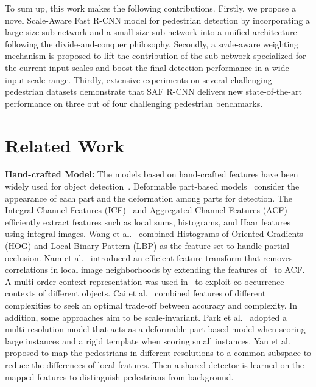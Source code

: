 \documentclass[journal]{IEEEtran}
\begin{document}
To sum up, this work makes the following contributions. Firstly, we propose a novel Scale-Aware Fast R-CNN model for pedestrian detection by incorporating a large-size sub-network and a small-size sub-network into a unified architecture following the divide-and-conquer philosophy. Secondly, a scale-aware weighting mechanism is proposed to lift the contribution of the sub-network specialized for the current input scales and boost the final detection performance in a wide input scale range. Thirdly, extensive experiments on several challenging pedestrian datasets demonstrate that SAF R-CNN delivers new state-of-the-art performance on three out of four challenging pedestrian benchmarks.


\section{Related Work}
\textbf{Hand-crafted Model:} The models based on hand-crafted features have been widely used for object detection~\cite{dalal2005histograms,viola2003detecting,wang2009hog,dollar2009integral,compact,dollar2014fast,zhang2014informed,felzenszwalb2010object,zheng2013strip,pang2014distributed,pang2016learning}. Deformable part-based models~\cite{felzenszwalb2010object} consider the appearance of each part and the deformation among parts for detection. The Integral Channel Features (ICF)~\cite{dollar2009integral} and Aggregated Channel Features (ACF)~\cite{dollar2014fast} efficiently extract features such as local sums, histograms, and Haar features using integral images. Wang et al.~\cite{wang2009hog} combined Histograms of Oriented Gradients (HOG) and Local Binary Pattern (LBP) as the feature set to handle partial occlusion. Nam et al.~\cite{nam2014local} introduced an efficient feature transform that removes correlations in local image neighborhoods by extending the features of~\cite{hariharan2012discriminative} to ACF. A multi-order context representation was used in~\cite{chen2013detection} to exploit co-occurrence contexts of different objects. Cai et al.~\cite{compact} combined features of different complexities to seek an optimal trade-off between accuracy and complexity. In addition, some approaches aim to be scale-invariant. Park et al.~\cite{park2010multiresolution} adopted a multi-resolution model that acts as a deformable part-based model when scoring large instances and a rigid template when scoring small instances. Yan et al.~\cite{yan2013robust} proposed to map the pedestrians in different resolutions to a common subspace to reduce the differences of local features. Then a shared detector is learned on the mapped features to distinguish pedestrians from background.
\end{document}

